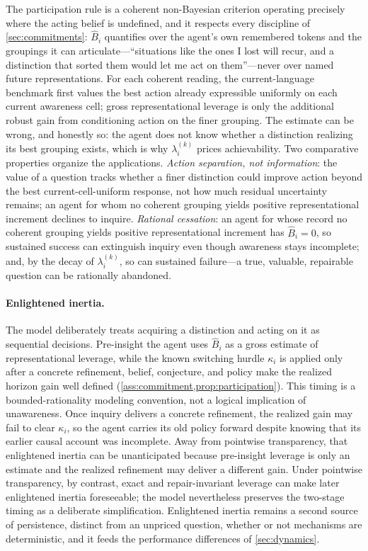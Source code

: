 \documentclass[11pt]{article}
\theoremstyle{definition}
\begin{document}
The participation rule is a coherent non-Bayesian criterion operating precisely where the acting belief is undefined, and it respects every discipline of \cref{sec:commitments}: $\widehat B_i$ quantifies over the agent's own remembered tokens and the groupings it can articulate---``situations like the ones I lost will recur, and a distinction that sorted them would let me act on them''---never over named future representations.
For each coherent reading, the current-language benchmark first values the best action already expressible uniformly on each current awareness cell; gross representational leverage is only the additional robust gain from conditioning action on the finer grouping.
The estimate can be wrong, and honestly so: the agent does not know whether a distinction realizing its best grouping exists, which is why $\lambda_i^{(k)}$ prices achievability.
Two comparative properties organize the applications.
\emph{Action separation, not information}: the value of a question tracks whether a finer distinction could improve action beyond the best current-cell-uniform response, not how much residual uncertainty remains; an agent for whom no coherent grouping yields positive representational increment declines to inquire.
\emph{Rational cessation}: an agent for whose record no coherent grouping yields positive representational increment has $\widehat B_i=0$, so sustained success can extinguish inquiry even though awareness stays incomplete; and, by the decay of $\lambda_i^{(k)}$, so can sustained failure---a true, valuable, repairable question can be rationally abandoned.

\paragraph{Enlightened inertia.}
\label{rem:stickiness}
The model deliberately treats acquiring a distinction and acting on it as sequential decisions.
Pre-insight the agent uses $\widehat B_i$ as a gross estimate of representational leverage, while the known switching hurdle $\kappa_i$ is applied only after a concrete refinement, belief, conjecture, and policy make the realized horizon gain well defined (\cref{ass:commitment,prop:participation}).
This timing is a bounded-rationality modeling convention, not a logical implication of unawareness.
Once inquiry delivers a concrete refinement, the realized gain may fail to clear $\kappa_i$, so the agent carries its old policy forward despite knowing that its earlier causal account was incomplete.
Away from pointwise transparency, that enlightened inertia can be unanticipated because pre-insight leverage is only an estimate and the realized refinement may deliver a different gain.
Under pointwise transparency, by contrast, exact and repair-invariant leverage can make later enlightened inertia foreseeable; the model nevertheless preserves the two-stage timing as a deliberate simplification.
Enlightened inertia remains a second source of persistence, distinct from an unpriced question, whether or not mechanisms are deterministic, and it feeds the performance differences of \cref{sec:dynamics}.
\end{document}
